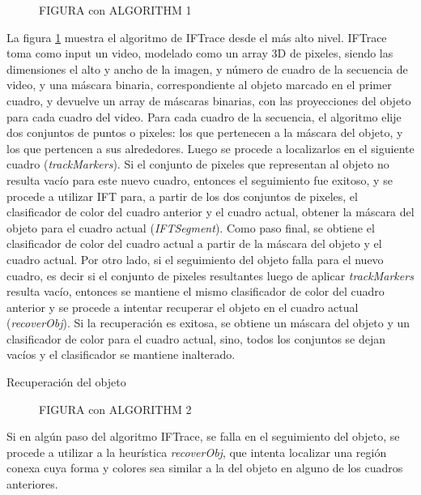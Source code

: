 \documentclass[a4paper,10pt]{article}
\begin{document}
 \begin{figure}[H]
        \caption{FIGURA con ALGORITHM 1}
        \label{fig:IFTrace-algorithm1}
\end{figure}


La figura \ref{fig:IFTrace-algorithm1} muestra el algoritmo de IFTrace desde el más alto nivel.
IFTrace toma como input un video, modelado como un array 3D de pixeles, siendo las dimensiones el alto y ancho de la imagen, y número de cuadro de la secuencia de video, y una 
máscara binaria, correspondiente al objeto marcado en el primer cuadro, y devuelve un array de máscaras binarias, con las proyecciones del objeto para cada cuadro del video.
Para cada cuadro de la secuencia, el algoritmo elije dos conjuntos de puntos o pixeles: los que pertenecen a la máscara del objeto, y los que pertencen a sus alrededores. Luego se 
procede 
a localizarlos en el siguiente cuadro (\textit{trackMarkers}). Si el conjunto de pixeles que representan al objeto no resulta vacío para este nuevo cuadro, entonces el seguimiento
fue exitoso, y se procede a utilizar IFT para, a partir de los dos conjuntos de pixeles, el clasificador de color del cuadro anterior y el cuadro actual, obtener la máscara del 
objeto para el cuadro actual (\textit{IFTSegment}). Como paso final, se obtiene el clasificador de color del cuadro actual a partir de la máscara del objeto y el cuadro actual.
Por otro lado, si el seguimiento del objeto falla para el nuevo cuadro, es decir si el conjunto de pixeles resultantes luego de aplicar \textit{trackMarkers} resulta vacío, 
entonces se mantiene el mismo clasificador de color del cuadro anterior y se procede
a intentar recuperar el objeto en el cuadro actual (\textit{recoverObj}). Si la recuperación
es exitosa, se obtiene un máscara del objeto y un clasificador de color para el cuadro actual,
sino, todos los conjuntos se dejan vacíos y el clasificador se mantiene inalterado.\

Recuperación del objeto\\
 \begin{figure}[H]
        \caption{FIGURA con ALGORITHM 2}
        \label{fig:IFTrace-algorithm2}
\end{figure}

Si en algún paso del algoritmo IFTrace, se falla en el seguimiento del objeto, se 
procede a utilizar a la heurística \textit{recoverObj}, que intenta localizar una
región conexa cuya forma y colores sea similar a la del objeto en alguno de los 
cuadros anteriores.\\
\end{document}
